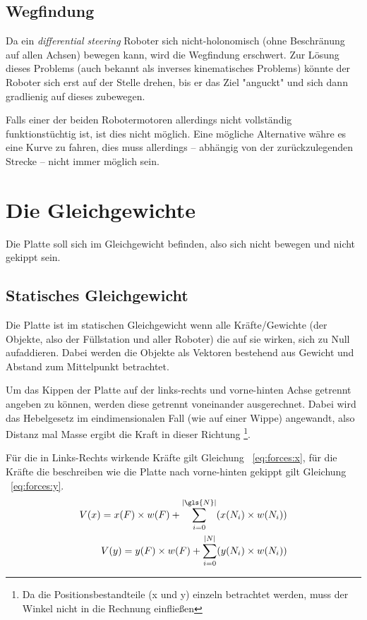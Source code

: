 \subsection{Wegfindung}
Da ein \textit{differential steering} Roboter sich nicht-holonomisch (ohne Beschr{\"{a}}nung auf allen Achsen) bewegen kann, wird die Wegfindung
erschwert. Zur L{\"{o}}sung dieses Problems (auch bekannt als inverses kinematisches Problems) k{\"{o}}nnte der Roboter sich erst auf der Stelle
drehen, bis er das Ziel "anguckt" und sich dann gradlienig auf dieses zubewegen.

Falls einer der beiden Robotermotoren allerdings nicht vollst{\"{a}}ndig funktionst{\"{u}}chtig ist, ist dies nicht m{\"{o}}glich. Eine m{\"{o}}gliche
Alternative w{\"{a}}hre es eine Kurve zu fahren, dies muss allerdings -- abh{\"{a}}ngig von der zur{\"{u}}ckzulegenden Strecke -- nicht immer m{\"{o}}glich
sein.

\clearpage
\section{Die Gleichgewichte}
Die Platte soll sich im Gleichgewicht befinden, also sich nicht bewegen und nicht gekippt sein. 

\subsection{Statisches Gleichgewicht}
Die Platte ist im statischen Gleichgewicht wenn alle Kr{\"{a}}fte/Gewichte (der Objekte, also der F{\"{u}}llstation und aller Roboter) die auf sie wirken, sich zu Null aufaddieren.
Dabei werden die Objekte als Vektoren bestehend aus Gewicht und Abstand zum Mittelpunkt betrachtet.

Um das Kippen der Platte auf der links-rechts und vorne-hinten Achse getrennt angeben zu k{\"{o}}nnen, werden diese getrennt voneinander ausgerechnet. Dabei wird das Hebelgesetz
im eindimensionalen Fall (wie auf einer Wippe) angewandt, also Distanz mal Masse ergibt die Kraft in dieser Richtung
\footnote{Da die Positionsbestandteile (x und y) einzeln betrachtet werden, muss der Winkel nicht in die Rechnung einflie{\ss}en}.

F{\"{u}}r die in Links-Rechts wirkende Kr{\"{a}}fte gilt Gleichung ~\ref{eq:forces:x}, f{\"{u}}r die Kr{\"{a}}fte die beschreiben wie die Platte nach vorne-hinten gekippt
gilt Gleichung ~\ref{eq:forces:y}.
\begin{subequations}\label{eq:forces}
\begin{align}
	V(x) = x(F) \times w(F) + \sum_{i=0}^{|\gls{N}|} ( x(N_i) \times w(N_i) ) \label{eq:forces:x}\\
	V(y) = y(F) \times w(F) + \sum_{i=0}^{|N|} ( y(N_i) \times w(N_i) ) \label{eq:forces:y}
\end{align}
\end{subequations}

